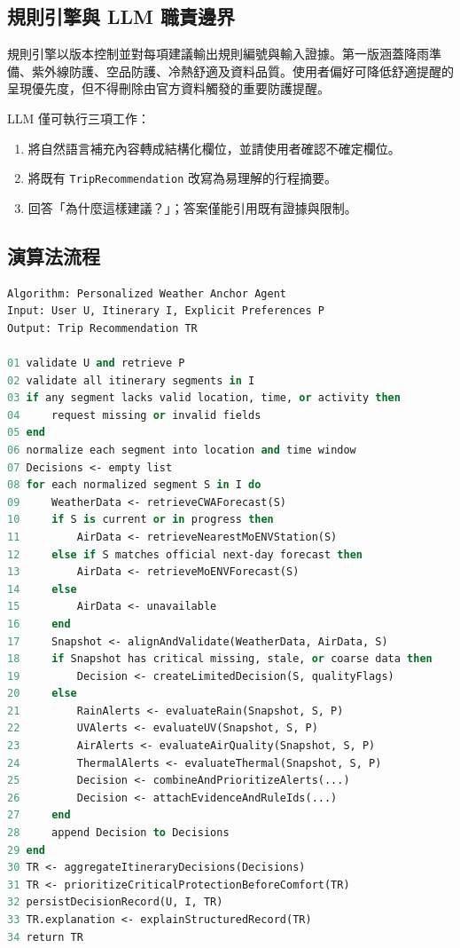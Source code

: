 \documentclass[conference]{IEEEtran}
\begin{document}
\subsection{規則引擎與 LLM 職責邊界}
規則引擎以版本控制並對每項建議輸出規則編號與輸入證據。第一版涵蓋降雨準備、紫外線防護、空品防護、冷熱舒適及資料品質。使用者偏好可降低舒適提醒的呈現優先度，但不得刪除由官方資料觸發的重要防護提醒。

LLM 僅可執行三項工作：
\begin{enumerate}[leftmargin=*]
\item 將自然語言補充內容轉成結構化欄位，並請使用者確認不確定欄位。
\item 將既有 \texttt{TripRecommendation} 改寫為易理解的行程摘要。
\item 回答「為什麼這樣建議？」；答案僅能引用既有證據與限制。
\end{enumerate}

\subsection{演算法流程}
\begin{lstlisting}[language=Pascal]
Algorithm: Personalized Weather Anchor Agent
Input: User U, Itinerary I, Explicit Preferences P
Output: Trip Recommendation TR

01 validate U and retrieve P
02 validate all itinerary segments in I
03 if any segment lacks valid location, time, or activity then
04     request missing or invalid fields
05 end
06 normalize each segment into location and time window
07 Decisions <- empty list
08 for each normalized segment S in I do
09     WeatherData <- retrieveCWAForecast(S)
10     if S is current or in progress then
11         AirData <- retrieveNearestMoENVStation(S)
12     else if S matches official next-day forecast then
13         AirData <- retrieveMoENVForecast(S)
14     else
15         AirData <- unavailable
16     end
17     Snapshot <- alignAndValidate(WeatherData, AirData, S)
18     if Snapshot has critical missing, stale, or coarse data then
19         Decision <- createLimitedDecision(S, qualityFlags)
20     else
21         RainAlerts <- evaluateRain(Snapshot, S, P)
22         UVAlerts <- evaluateUV(Snapshot, S, P)
23         AirAlerts <- evaluateAirQuality(Snapshot, S, P)
24         ThermalAlerts <- evaluateThermal(Snapshot, S, P)
25         Decision <- combineAndPrioritizeAlerts(...)
26         Decision <- attachEvidenceAndRuleIds(...)
27     end
28     append Decision to Decisions
29 end
30 TR <- aggregateItineraryDecisions(Decisions)
31 TR <- prioritizeCriticalProtectionBeforeComfort(TR)
32 persistDecisionRecord(U, I, TR)
33 TR.explanation <- explainStructuredRecord(TR)
34 return TR
\end{lstlisting}
\end{document}
